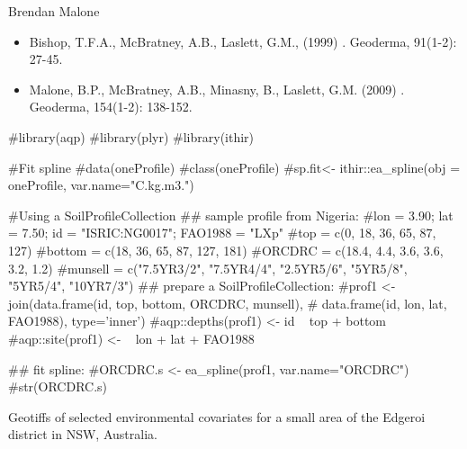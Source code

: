 \documentclass[a4paper]{book}
\begin{document}
%
\begin{Author}
 Brendan Malone 
\end{Author}
%
\begin{References}
\begin{itemize}

\item{} Bishop, T.F.A., McBratney, A.B., Laslett, G.M., (1999) . Geoderma, 91(1-2): 27-45. 
\item{} Malone, B.P., McBratney, A.B., Minasny, B., Laslett, G.M. (2009) . Geoderma, 154(1-2): 138-152.

\end{itemize}

\end{References}
%
\begin{Examples}
\begin{ExampleCode}
#library(aqp)
#library(plyr)
#library(ithir)

#Fit spline 
#data(oneProfile)
#class(oneProfile)
#sp.fit<- ithir::ea_spline(obj = oneProfile, var.name="C.kg.m3.")

#Using a SoilProfileCollection
## sample profile from Nigeria:
#lon = 3.90; lat = 7.50; id = "ISRIC:NG0017"; FAO1988 = "LXp" 
#top = c(0, 18, 36, 65, 87, 127) 
#bottom = c(18, 36, 65, 87, 127, 181)
#ORCDRC = c(18.4, 4.4, 3.6, 3.6, 3.2, 1.2)
#munsell = c("7.5YR3/2", "7.5YR4/4", "2.5YR5/6", "5YR5/8", "5YR5/4", "10YR7/3")
## prepare a SoilProfileCollection:
#prof1 <- join(data.frame(id, top, bottom, ORCDRC, munsell), 
#         data.frame(id, lon, lat, FAO1988), type='inner')
#aqp::depths(prof1) <- id ~ top + bottom
#aqp::site(prof1) <- ~ lon + lat + FAO1988 

## fit spline:
#ORCDRC.s <- ea_spline(prof1, var.name="ORCDRC")
#str(ORCDRC.s)

\end{ExampleCode}
\end{Examples}
%
\begin{Description}
Geotiffs of selected environmental covariates for a small area of the Edgeroi district in NSW, Australia.
\end{Description}
\end{document}
